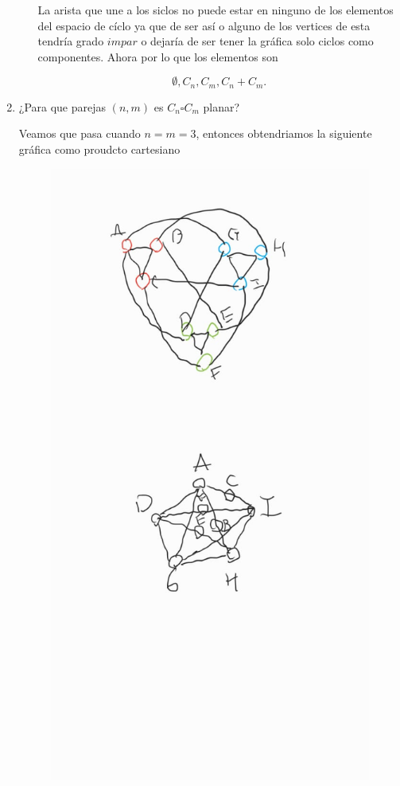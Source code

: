 \documentclass[letterpaper]{article}
\newcommand{\1}{\mathbbm{1}}
\begin{document}
\begin{enumerate}
\begin{enumerate}
			La arista que une a los siclos no puede estar en ninguno de los elementos del espacio de cíclo ya que de ser así o alguno de los vertices de esta tendría grado $impar$ o dejaría de ser tener la gráfica solo ciclos como componentes. Ahora por lo que los elementos son

			\[\emptyset, C_n, C_m, C_n+C_m.\]

		\end{enumerate}

		\item ¿Para que parejas $(n,m)$ es $C_n\square C_m$ planar?
		
		Veamos que pasa cuando $n = m = 3$, entonces obtendriamos la siguiente gráfica como proudcto cartesiano

		\begin{figure}[H]
			\centering
			\includegraphics[scale=.25]{1.jpeg}
		\end{figure}
		

\end{enumerate}
\end{document}
